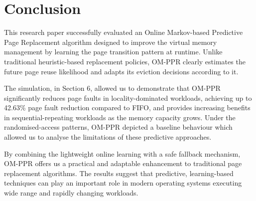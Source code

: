 \documentclass[conference]{IEEEtran}
\begin{document}
\section{\textbf{Conclusion}}

This research paper successfully evaluated an Online Markov-based Predictive Page Replacement algorithm designed to improve the virtual memory management by learning the page transition pattern at runtime. Unlike traditional heuristic-based replacement policies, OM-PPR clearly estimates the future page reuse likelihood and adapts its eviction decisions according to it.

The simulation, in Section 6, allowed us to demonstrate that OM-PPR significantly reduces page faults in locality-dominated workloads, achieving up to 42.63\% page fault reduction compared to FIFO, and provides increasing benefits in sequential-repeating workloads as the memory capacity grows. Under the randomised-access patterns, OM-PPR depicted a baseline behaviour which allowed us to analyse the limitations of these predictive approaches.

By combining the lightweight online learning with a safe fallback mechanism, OM-PPR offers us a practical and adaptable enhancement to traditional page replacement algorithms. The results suggest that predictive, learning-based techniques can play an important role in modern operating systems executing wide range and rapidly changing workloads.

\vspace{0.7\baselineskip}
\end{document}
